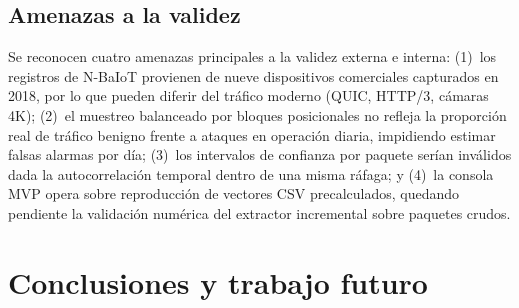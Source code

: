 \documentclass[11pt,a4paper]{article}
\begin{document}
\subsection{Amenazas a la validez}
Se reconocen cuatro amenazas principales a la validez externa e interna: (1)~los registros de N-BaIoT provienen de nueve dispositivos comerciales capturados en 2018, por lo que pueden diferir del tráfico moderno (QUIC, HTTP/3, cámaras 4K); (2)~el muestreo balanceado por bloques posicionales no refleja la proporción real de tráfico benigno frente a ataques en operación diaria, impidiendo estimar falsas alarmas por día; (3)~los intervalos de confianza por paquete serían inválidos dada la autocorrelación temporal dentro de una misma ráfaga; y (4)~la consola MVP opera sobre reproducción de vectores CSV precalculados, quedando pendiente la validación numérica del extractor incremental sobre paquetes crudos.

\section{Conclusiones y trabajo futuro}
\end{document}

